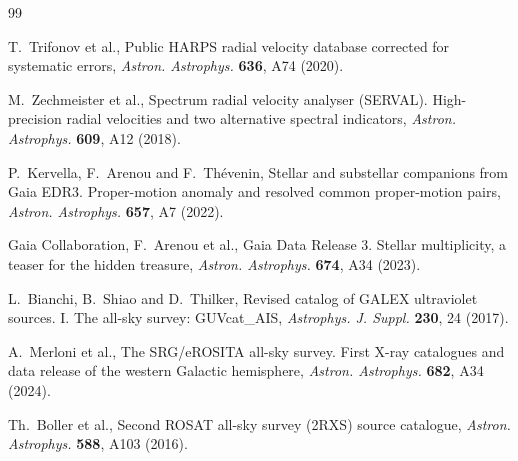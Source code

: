 \documentclass[3p,11pt]{elsarticle}
\begin{document}
\begin{thebibliography}{99}\small\raggedright
\setlength{\itemsep}{1pt}

T.~Trifonov et al., Public HARPS radial velocity database corrected for systematic errors,
\emph{Astron. Astrophys.} \textbf{636}, A74 (2020).

M.~Zechmeister et al., Spectrum radial velocity analyser (SERVAL). High-precision radial
velocities and two alternative spectral indicators, \emph{Astron. Astrophys.} \textbf{609}, A12
(2018).

P.~Kervella, F.~Arenou and F.~Th\'evenin, Stellar and substellar companions from Gaia EDR3.
Proper-motion anomaly and resolved common proper-motion pairs, \emph{Astron. Astrophys.}
\textbf{657}, A7 (2022).

Gaia Collaboration, F.~Arenou et al., Gaia Data Release 3. Stellar multiplicity, a teaser for the
hidden treasure, \emph{Astron. Astrophys.} \textbf{674}, A34 (2023).

L.~Bianchi, B.~Shiao and D.~Thilker, Revised catalog of GALEX ultraviolet sources. I. The
all-sky survey: GUVcat\_AIS, \emph{Astrophys. J. Suppl.} \textbf{230}, 24 (2017).

A.~Merloni et al., The SRG/eROSITA all-sky survey. First X-ray catalogues and data release of the
western Galactic hemisphere, \emph{Astron. Astrophys.} \textbf{682}, A34 (2024).

Th.~Boller et al., Second ROSAT all-sky survey (2RXS) source catalogue, \emph{Astron. Astrophys.}
\textbf{588}, A103 (2016).

\end{thebibliography}
\end{document}
